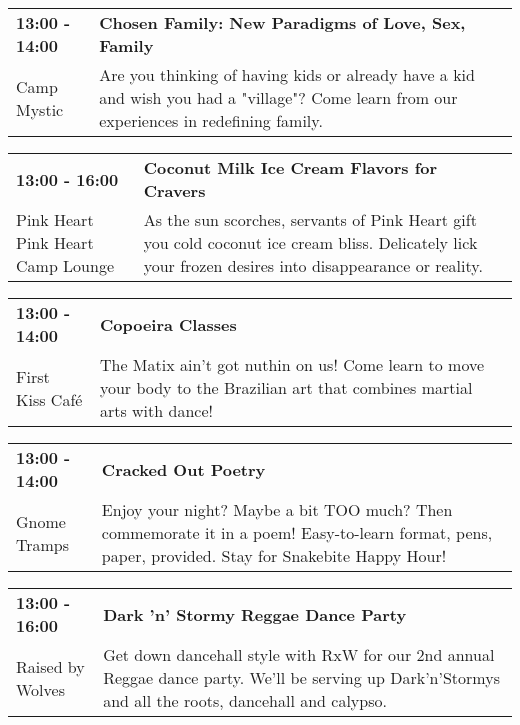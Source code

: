 \begin{tabular}{ p{1in} p{2.2in} }
    \textbf{13:00 - 14:00} & \textbf{Chosen Family: New Paradigms of Love, Sex, Family } \\
    Camp Mystic \newline  & Are you thinking of having kids or already have a kid and wish you had a "village"? Come learn from our experiences in redefining family. \\
    \hline 
\end{tabular}
    
\begin{tabular}{ p{1in} p{2.2in} }
    \textbf{13:00 - 16:00} & \textbf{Coconut Milk Ice Cream Flavors for Cravers} \\
    Pink Heart \newline Pink Heart Camp Lounge & As the sun scorches, servants of Pink Heart gift you cold coconut ice cream bliss. Delicately lick your frozen desires into disappearance or reality. \\
    \hline 
\end{tabular}
    
\begin{tabular}{ p{1in} p{2.2in} }
    \textbf{13:00 - 14:00} & \textbf{Copoeira Classes} \\
    First Kiss Caf\'e \newline  & The Matix ain't got nuthin on us!  Come learn to move your body to the Brazilian art that combines martial arts with dance! \\
    \hline 
\end{tabular}
    
\begin{tabular}{ p{1in} p{2.2in} }
    \textbf{13:00 - 14:00} & \textbf{Cracked Out Poetry} \\
    Gnome Tramps \newline  & Enjoy your night? Maybe a bit TOO much? Then commemorate it in a poem! Easy-to-learn format, pens, paper, provided. Stay for Snakebite Happy Hour! \\
    \hline 
\end{tabular}
    
\begin{tabular}{ p{1in} p{2.2in} }
    \textbf{13:00 - 16:00} & \textbf{Dark 'n' Stormy Reggae Dance Party} \\
    Raised by Wolves \newline  & Get down dancehall style with RxW for our 2nd annual Reggae dance party. We'll be serving up Dark'n'Stormys and all the roots, dancehall and calypso. \\
    \hline 
\end{tabular}
    
